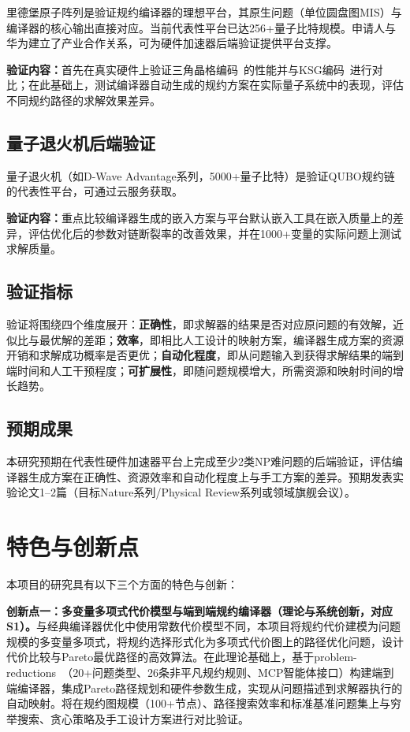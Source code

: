 里德堡原子阵列是验证规约编译器的理想平台，其原生问题（单位圆盘图MIS）与编译器的核心输出直接对应。当前代表性平台已达256+量子比特规模。申请人与华为建立了产业合作关系，可为硬件加速器后端验证提供平台支撑。

\textbf{验证内容：}首先在真实硬件上验证三角晶格编码~\cite{Pan2025Triangular}的性能并与KSG编码~\cite{Nguyen2023PRXQuantum}进行对比；在此基础上，测试编译器自动生成的规约方案在实际量子系统中的表现，评估不同规约路径的求解效果差异。

\subsection{量子退火机后端验证}

量子退火机（如D-Wave Advantage系列，5000+量子比特）是验证QUBO规约链的代表性平台，可通过云服务获取。

\textbf{验证内容：}重点比较编译器生成的嵌入方案与平台默认嵌入工具在嵌入质量上的差异，评估优化后的参数对链断裂率的改善效果，并在1000+变量的实际问题上测试求解质量。

\subsection{验证指标}

验证将围绕四个维度展开：\textbf{正确性}，即求解器的结果是否对应原问题的有效解，近似比与最优解的差距；\textbf{效率}，即相比人工设计的映射方案，编译器生成方案的资源开销和求解成功概率是否更优；\textbf{自动化程度}，即从问题输入到获得求解结果的端到端时间和人工干预程度；\textbf{可扩展性}，即随问题规模增大，所需资源和映射时间的增长趋势。

\subsection{预期成果}

本研究预期在代表性硬件加速器平台上完成至少2类NP难问题的后端验证，评估编译器生成方案在正确性、资源效率和自动化程度上与手工方案的差异。预期发表实验论文1--2篇（目标Nature系列/Physical Review系列或领域旗舰会议）。


\section{特色与创新点}

本项目的研究具有以下三个方面的特色与创新：

\textbf{创新点一：多变量多项式代价模型与端到端规约编译器（理论与系统创新，对应S1）。}与经典编译器优化中使用常数代价模型不同，本项目将规约代价建模为问题规模的多变量多项式，将规约选择形式化为多项式代价图上的路径优化问题，设计代价比较与Pareto最优路径的高效算法。在此理论基础上，基于problem-reductions~\cite{ProblemReductions2025}（20+问题类型、26条非平凡规约规则、MCP智能体接口）构建端到端编译器，集成Pareto路径规划和硬件参数生成，实现从问题描述到求解器执行的自动映射。将在规约图规模（100+节点）、路径搜索效率和标准基准问题集上与穷举搜索、贪心策略及手工设计方案进行对比验证。

